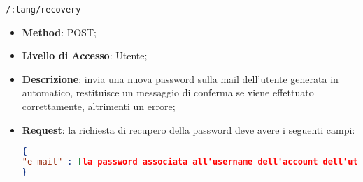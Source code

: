 	\item \texttt{/:lang/recovery}
		\begin{itemize}
			\item \textbf{Method}: POST;
			\item \textbf{Livello di Accesso}: Utente;
			\item \textbf{Descrizione}: invia una nuova password sulla mail dell'utente generata in automatico, restituisce un messaggio di conferma se viene effettuato correttamente, altrimenti un errore;
			\item \textbf{Request}: la richiesta di recupero della password deve avere i seguenti campi:
\begin{lstlisting}[language=json,firstnumber=1]
{
"e-mail" : [la password associata all'username dell'account dell'utente]
}
\end{lstlisting}
		\end{itemize}